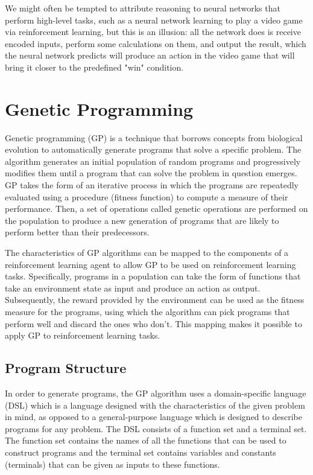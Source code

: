 We might often be tempted to attribute reasoning to neural networks that perform high-level tasks, such as a neural network learning to play a video game via reinforcement learning, but this is an illusion: all the network does is receive encoded inputs, perform some calculations on them, and output the result, which the neural network predicts will produce an action in the video game that will bring it closer to the predefined "win" condition.

\section{Genetic Programming}
Genetic programming (GP) is a technique that borrows concepts from biological evolution to automatically generate programs that solve a specific problem. The algorithm generates an initial population of random programs and progressively modifies them until a program that can solve the problem in question emerges. GP takes the form of an iterative process in which the programs are repeatedly evaluated using a procedure (fitness function) to compute a measure of their performance. Then, a set of operations called genetic operations are performed on the population to produce a new generation of programs that are likely to perform better than their predecessors.

The characteristics of GP algorithms can be mapped to the components of a reinforcement learning agent to allow GP to be used on reinforcement learning tasks. Specifically, programs in a population can take the form of functions that take an environment state as input and produce an action as output. Subsequently, the reward provided by the environment can be used as the fitness measure for the programs, using which the algorithm can pick programs that perform well and discard the ones who don't. This mapping makes it possible to apply GP to reinforcement learning tasks.

\subsection{Program Structure}
In order to generate programs, the GP algorithm uses a domain-specific language (DSL) which is a language designed with the characteristics of the given problem in mind, as opposed to a general-purpose language which is designed to describe programs for any problem. The DSL consists of a function set and a terminal set. The function set contains the names of all the functions that can be used to construct programs and the terminal set contains variables and constants (terminals) that can be given as inputs to these functions. 

